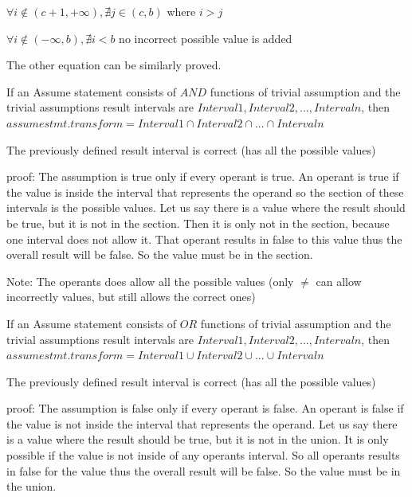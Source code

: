  $\forall i \notin (c+1, +\infty), \nexists j \in (c, b)$ where $ i>j$ 
 
 $\forall i \notin (-\infty, b), \nexists  i<b$ no incorrect possible value is added
 
 The other equation can be similarly proved.

\begin{definition}
	If an Assume statement consists of $AND$ functions of trivial assumption and the trivial assumptions result intervals are $Interval1, Interval2, ..., Intervaln$, then $assumestmt.transform = Interval1 \cap Interval2 \cap ... \cap Intervaln $
\end{definition} 

\begin{theorem}
	The previously defined result interval is correct (has all the possible values)
\end{theorem}
{proof: } The assumption is true only if every operant is true. An operant is true if the value is inside the interval that represents the operand so the section of these intervals is the possible values. Let us say there is a value where the result should be true, but it is not in the section. Then it is only not in the section, because one interval does not allow it. That operant results in false to this value thus the overall result will be false. So the value must be in the section.

Note: The operants does allow all the possible values (only $\neq$ can allow incorrectly values, but still allows the correct ones)

\begin{definition}
	If an Assume statement consists of $OR$ functions of trivial assumption and the trivial assumptions result intervals are $Interval1, Interval2, ..., Intervaln$, then $assumestmt.transform = Interval1 \cup Interval2 \cup ... \cup Intervaln $
\end{definition} 

\begin{theorem}
	The previously defined result interval is correct (has all the possible values)
\end{theorem}
{proof: } The assumption is false only if every operant is false. An operant is false if the value is not inside the interval that represents the operand. Let us say there is a value where the result should be true, but it is not in the union. It is only possible if the value is not inside of any operants interval. So all operants results in false for the value thus the overall result will be false. So the value must be in the union.

